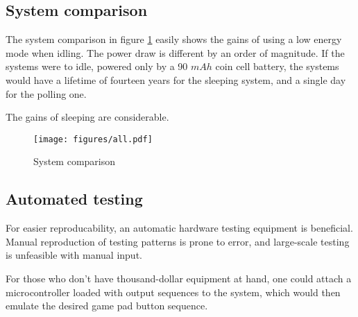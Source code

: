 \pagebreak

\subsection{System comparison}

The system comparison in figure \ref{fig:system-comparison} easily shows the gains of using a low energy mode when idling. The power draw is different by an order of magnitude. If the systems were to idle, powered only by a 90 $mAh$ coin cell battery, the systems would have a lifetime of fourteen years for the sleeping system, and a single day for the polling one.

The gains of sleeping are considerable.

\begin{figure}[h]
\centering
\texttt{[image: figures/all.pdf]}
\caption{System comparison}
\label{fig:system-comparison}
\end{figure}

\subsection{Automated testing}

For easier reproducability, an automatic hardware testing equipment is beneficial. Manual reproduction of testing patterns is prone to error, and large-scale testing is unfeasible with manual input.

For those who don't have thousand-dollar equipment at hand, one could attach a microcontroller loaded with output sequences to the system, which would then emulate the desired game pad button sequence.